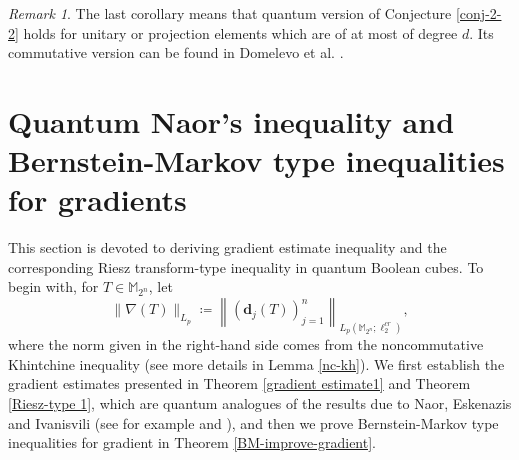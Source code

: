 \documentclass{amsbook}
\theoremstyle{definition}
\theoremstyle{remark}
\newtheorem{remark}[theorem]{Remark}
\numberwithin{section}{chapter}
\numberwithin{equation}{chapter}
\newcommand{\M}{\mathbb{M}}
\newcommand{\1}{\mathbf{1}}
\newcommand{\dc}{\mathbf{d}}
\begin{document}
\begin{remark}
The last corollary means that quantum version of Conjecture \ref{conj-2-2} holds for  unitary or  projection elements which are of at most of degree $d$.  Its commutative version  can be found in Domelevo et al.  \cite{DDFKOSW2025}. 
\end{remark}


\section[Quantum inequalities for gradients]{Quantum Naor's inequality and  Bernstein-Markov type inequalities for gradients}
This section is devoted to deriving gradient estimate inequality and the corresponding Riesz transform-type inequality in quantum Boolean cubes.  To begin with, for $T\in \M_{2^{n}}$, let
\[
\|\nabla(T)\|_{L_{p}}\coloneqq \left\|(\dc_{j}(T))_{j=1}^{n}\right\|_{L_{p}(\M_{2^{n}};\ell^{cr}_{2})},
\]
where the norm given in the right-hand side comes from the noncommutative Khintchine inequality (see more details in Lemma \ref{nc-kh}). We first establish the gradient estimates presented in Theorem \ref{gradient estimate1} and Theorem \ref{Riesz-type 1}, which are quantum analogues of the results due to Naor, Eskenazis and Ivanisvili (see for example \cite[Proposition 43]{EI2020} and  \cite[Lemma 44]{EI2020}), and then we prove Bernstein-Markov type inequalities for gradient in Theorem \ref{BM-improve-gradient}. 
\end{document}
